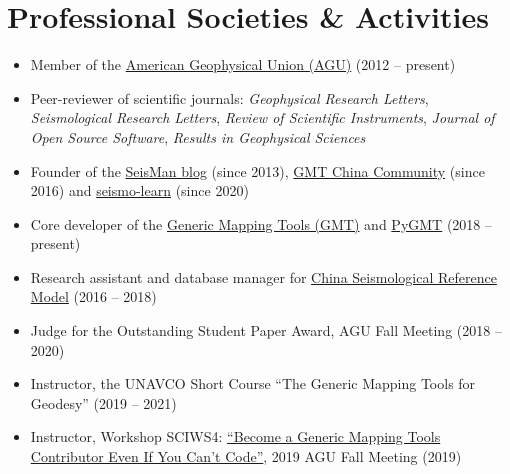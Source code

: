 \section*{Professional Societies \& Activities}

\begin{itemize}
\item Member of the \href{https://sites.agu.org/}{American Geophysical Union (AGU)} (2012 -- present)
\item Peer-reviewer of scientific journals:
      \textit{Geophysical Research Letters},
      \textit{Seismological Research Letters},
      \textit{Review of Scientific Instruments},
      \textit{Journal of Open Source Software},
      \textit{Results in Geophysical Sciences}
\item Founder of the \href{https://blog.seisman.info}{SeisMan blog} (since 2013),
      \href{http://gmt-china.org/}{GMT China Community} (since 2016)
      and \href{https://seismo-learn.org/}{seismo-learn} (since 2020)
\item Core developer of the \href{https://github.com/GenericMappingTools/gmt}{Generic Mapping Tools (GMT)} and \href{https://github.com/GenericMappingTools/pygmt}{PyGMT} (2018 -- present)
\item Research assistant and database manager for \href{http://chinageorefmodel.org/}{China Seismological Reference Model} (2016 -- 2018)
\item Judge for the Outstanding Student Paper Award, AGU Fall Meeting (2018 -- 2020)
\item Instructor, the UNAVCO Short Course ``The Generic Mapping Tools for Geodesy'' (2019 -- 2021)
\item Instructor, Workshop SCIWS4: \href{https://www.agu.org/Events/SCIWS4-Generic-Mapping-Tools}{``Become a Generic Mapping Tools Contributor Even If You Can't Code''}, 2019 AGU Fall Meeting (2019)
\end{itemize}